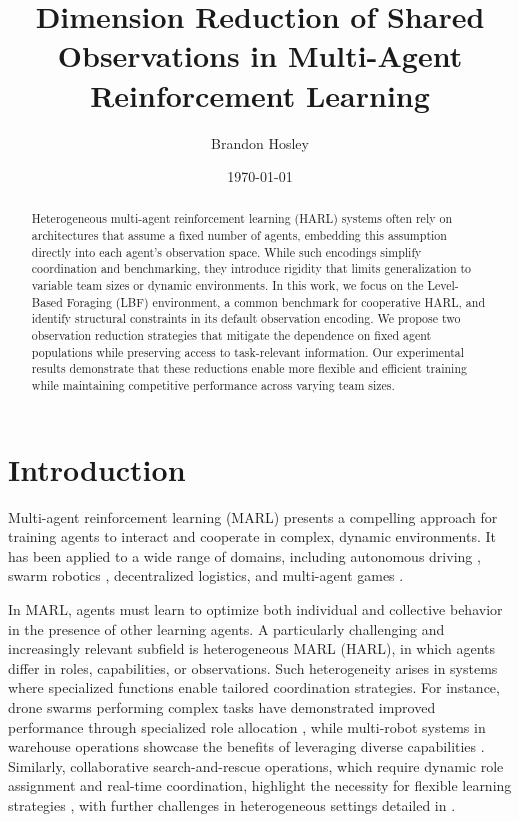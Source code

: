 \documentclass{article}
\title{Dimension Reduction of Shared Observations in Multi-Agent Reinforcement Learning}
\author{Brandon Hosley}
\date{\today}
\begin{document}
\maketitle

\begin{abstract}
Heterogeneous multi-agent reinforcement learning (HARL) systems 
often rely on architectures that assume a fixed number of agents, 
embedding this assumption directly into each agent's observation space. 
While such encodings simplify coordination and benchmarking, 
they introduce rigidity that limits generalization to variable team 
sizes or dynamic environments. 
In this work, we focus on the Level-Based Foraging (LBF) environment, 
a common benchmark for cooperative HARL, 
and identify structural constraints in its default observation encoding. 
We propose two observation reduction strategies that mitigate the dependence 
on fixed agent populations while preserving access to task-relevant information. 
Our experimental results demonstrate that these reductions enable more 
flexible and efficient training while maintaining competitive 
performance across varying team sizes.
\end{abstract}

\section{Introduction}

Multi-agent reinforcement learning (MARL) presents a compelling approach for training agents to 
interact and cooperate in complex, dynamic environments. It has been applied to a wide range of 
domains, including autonomous driving \cite{yang2021a}, swarm robotics \cite{brambilla2013}, 
decentralized logistics, and multi-agent games \cite{vinyals2019,berner2019}.
 
In MARL, agents must learn to optimize both individual and collective behavior in the presence 
of other learning agents. A particularly challenging and increasingly relevant subfield is 
heterogeneous MARL (HARL), in which agents differ in roles, capabilities, or observations. Such 
heterogeneity arises in systems where specialized functions enable tailored coordination 
strategies. For instance, drone swarms performing complex tasks have demonstrated improved 
performance through specialized role allocation \cite{huttenrauch2019}, while multi-robot 
systems in warehouse operations showcase the benefits of leveraging diverse capabilities 
\cite{rizk2019}. Similarly, collaborative search-and-rescue operations, which require dynamic 
role assignment and real-time coordination, highlight the necessity for flexible learning 
strategies \cite{hoang2023}, with further challenges in heterogeneous settings detailed in 
\cite{kapetanakis2005,hernandez-leal2019}.
\end{document}
